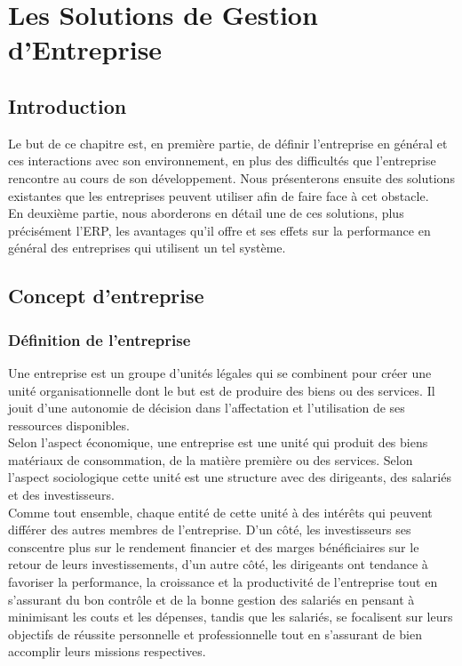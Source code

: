 \chapter{Les Solutions de Gestion d'Entreprise}

\section{Introduction}
    Le but de ce chapitre est, en première partie, de définir l'entreprise en général et ces interactions avec son environnement, en plus des difficultés que l'entreprise rencontre au cours de son développement. Nous présenterons ensuite des solutions existantes que les entreprises peuvent utiliser afin de faire face à cet obstacle.\\

    En deuxième partie, nous aborderons en détail une de ces solutions, plus précisément l'\acs{ERP}, les avantages qu'il offre et ses effets sur la performance en général des entreprises qui utilisent un tel système.\\ 

\section{Concept d’entreprise}
    \subsection{Définition de l’entreprise \cite{def-entreprise}}
        Une entreprise est un groupe d'unités légales qui se combinent pour créer une unité organisationnelle dont le but est de produire des biens ou des services. Il jouit d'une autonomie de décision dans l'affectation et l'utilisation de ses ressources disponibles.\\

        Selon l'aspect économique, une entreprise est une unité qui produit des biens matériaux de consommation, de la matière première ou des services. Selon l'aspect sociologique cette unité est une structure avec des dirigeants, des salariés et des investisseurs.\\ 

        Comme tout ensemble, chaque entité de cette unité à des intérêts qui peuvent différer des autres membres de l'entreprise. D'un côté, les investisseurs ses conscentre plus sur le rendement financier et des marges bénéficiaires sur le retour de leurs investissements, d'un autre côté, les dirigeants ont tendance à favoriser la performance, la croissance et la productivité de l'entreprise tout en s'assurant du bon contrôle et de la bonne gestion des salariés en pensant à minimisant les couts et les dépenses, tandis que les salariés, se focalisent sur leurs objectifs de réussite personnelle et professionnelle tout en s'assurant de bien accomplir leurs missions respectives.\\

